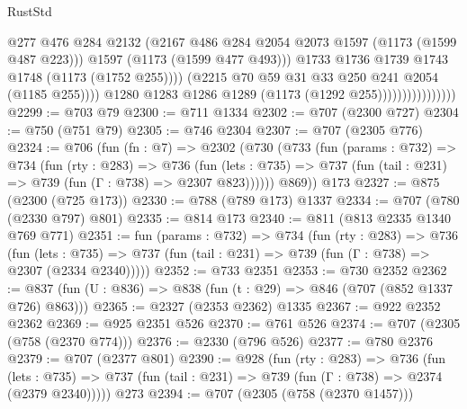 \begin{lexlean}{RustStd}
\begin{coremodule}
                                          @277
                                          @476
                                          @284
                                          @2132
                                          (@2167
                                            @486
                                            @284
                                            @2054
                                            @2073
                                            @1597
                                            (@1173 (@1599 @487 @223)))
                                          @1597
                                          (@1173 (@1599 @477 @493)))
                                        @1733
                                        @1736
                                        @1739
                                        @1743
                                        @1748
                                        (@1173 (@1752 @255))))
                                    (@2215 @70 @59 @31 @33 @250 @241 @2054 (@1185 @255))))
                                @1280
                                @1283
                                @1286
                                @1289
                                (@1173 (@1292 @255))))))))))))))))
@2299 := @703 @79
@2300 := @711 @1334
@2302 := @707 (@2300 @727)
@2304 := @750 (@751 @79)
@2305 := @746 @2304
@2307 := @707 (@2305 @776)
@2324 := @706
    (fun (fn : @7) =>
    @2302
      (@730
        (@733
          (fun (params : @732) =>
          @734
            (fun (rty : @283) =>
            @736
              (fun (lets : @735) =>
              @737 (fun (tail : @231) => @739 (fun (Γ : @738) => @2307 @823))))))
        @869))
    @173
@2327 := @875 (@2300 (@725 @173))
@2330 := @788 (@789 @173) @1337
@2334 := @707 (@780 (@2330 @797) @801)
@2335 := @814 @173
@2340 := @811 (@813 @2335 @1340 @769 @771)
@2351 := fun (params : @732) =>
  @734
    (fun (rty : @283) =>
    @736
      (fun (lets : @735) =>
      @737 (fun (tail : @231) => @739 (fun (Γ : @738) => @2307 (@2334 @2340)))))
@2352 := @733 @2351
@2353 := @730 @2352
@2362 := @837 (fun (U : @836) => @838 (fun (t : @29) => @846 (@707 (@852 @1337 @726) @863)))
@2365 := @2327 (@2353 @2362) @1335
@2367 := @922 @2352 @2362
@2369 := @925 @2351 @526
@2370 := @761 @526
@2374 := @707 (@2305 (@758 (@2370 @774)))
@2376 := @2330 (@796 @526)
@2377 := @780 @2376
@2379 := @707 (@2377 @801)
@2390 := @928
    (fun (rty : @283) =>
    @736
      (fun (lets : @735) =>
      @737 (fun (tail : @231) => @739 (fun (Γ : @738) => @2374 (@2379 @2340)))))
    @273
@2394 := @707 (@2305 (@758 (@2370 @1457)))

\end{coremodule}
\end{lexlean}
